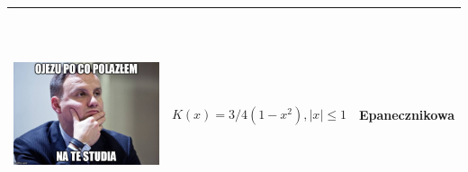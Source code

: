 \documentclass[a4paper,12pt,twoside]{article}
\begin{document}
\begin{table}[h!]
\begin{tabular}{ | c | m{6cm} | m{3cm} | }
\begin{minipage}[c][7cm]{.4\textwidth}
      \includegraphics[width=\linewidth, height=60mm]{dudel.jpg}
    \end{minipage}
    &
     $ K(x)=3/4(1-x^2), |x|\leq1$
    & 
    Epanecznikowa
    \\ \hline
    \end{tabular}
  \label{tbl:myLboro}
\end{table}
\end{document}
